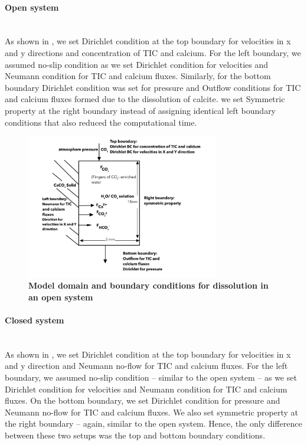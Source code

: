 \paragraph*{Open system} \mbox{} \\

As shown in , we set Dirichlet condition at the top boundary for velocities in x and y directions 
and concentration of TIC and calcium. For the left boundary, we assumed no-slip condition as we set Dirichlet condition for 
velocities and Neumann condition for TIC and calcium fluxes. Similarly, for the bottom boundary Dirichlet condition was set 
for pressure and Outflow conditions for TIC and calcium fluxes formed due to the dissolution of calcite. we set Symmetric property 
at the right boundary instead of assigning identical left boundary conditions that also reduced the computational time.

\begin{figure}
    \centering
    \includegraphics[width=0.75\textwidth]{PICTURES/opened_system.jpg}
    \caption [Model domain and boundary conditions for  dissolution in an open system] {\textbf{Model domain and boundary conditions for  dissolution in an open system}}
    \label{fig:OpenedSystem}       %
\end{figure}


\paragraph*{Closed system} \mbox{} \\
As shown in , we set Dirichlet condition at the top boundary for velocities in x and y direction and 
Neumann no-flow for TIC and calcium fluxes. For the left boundary, we assumed no-slip condition -- similar 
to the open system -- as we set Dirichlet condition for velocities and Neumann condition for TIC and calcium fluxes. On the 
bottom boundary, we set Dirichlet condition for pressure and Neumann no-flow for TIC and calcium fluxes. 
We also set symmetric property at the right boundary -- again, similar to the open system. Hence, the only difference between 
these two setups was the top and bottom boundary conditions. 

